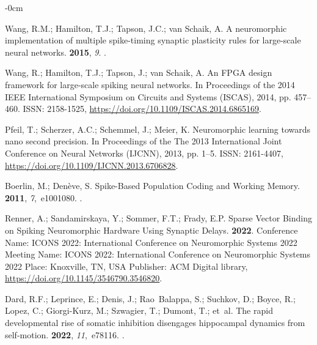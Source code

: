 \documentclass[brainsci, %
               review,submit,pdftex,moreauthors
               ]{Definitions/mdpi}
\begin{document}
\begin{adjustwidth}{-\extralength}{0cm}
\begin{thebibliography}{999}
  Wang, R.M.; Hamilton, T.J.; Tapson, J.C.; van Schaik, A.
  \newblock A neuromorphic implementation of multiple spike-timing synaptic
    plasticity rules for large-scale neural networks.
   {\bf 2015}, {\em 9}.
  .
  
  Wang, R.; Hamilton, T.J.; Tapson, J.; van Schaik, A.
  \newblock An {FPGA} design framework for large-scale spiking neural networks.
  \newblock In Proceedings of the 2014 {IEEE} {International} {Symposium} on
    {Circuits} and {Systems} ({ISCAS}),  2014, pp. 457--460.
  \newblock ISSN: 2158-1525, {\url{https://doi.org/10.1109/ISCAS.2014.6865169}}.
  
  Pfeil, T.; Scherzer, A.C.; Schemmel, J.; Meier, K.
  \newblock Neuromorphic learning towards nano second precision.
  \newblock In Proceedings of the The 2013 {International} {Joint} {Conference}
    on {Neural} {Networks} ({IJCNN}),  2013, pp. 1--5.
  \newblock ISSN: 2161-4407, {\url{https://doi.org/10.1109/IJCNN.2013.6706828}}.
  
  Boerlin, M.; Denève, S.
  \newblock Spike-{Based} {Population} {Coding} and {Working} {Memory}.
   {\bf 2011}, {\em 7},~e1001080.
  .
  
  Renner, A.; Sandamirskaya, Y.; Sommer, F.T.; Frady, E.P.
  \newblock Sparse {Vector} {Binding} on {Spiking} {Neuromorphic} {Hardware}
    {Using} {Synaptic} {Delays}.
   {\bf 2022}.
  \newblock Conference Name: ICONS 2022: International Conference on Neuromorphic
    Systems 2022 Meeting Name: ICONS 2022: International Conference on
    Neuromorphic Systems 2022 Place: Knoxville, TN, USA Publisher: ACM Digital
    library, {\url{https://doi.org/10.1145/3546790.3546820}}.
  
  Dard, R.F.; Leprince, E.; Denis, J.; Rao~Balappa, S.; Suchkov, D.; Boyce, R.;
    Lopez, C.; Giorgi-Kurz, M.; Szwagier, T.; Dumont, T.;  et~al.
  \newblock The rapid developmental rise of somatic inhibition disengages
    hippocampal dynamics from self-motion.
   {\bf 2022}, {\em 11},~e78116.
  .
  

\end{thebibliography}
\end{adjustwidth}
\end{document}
